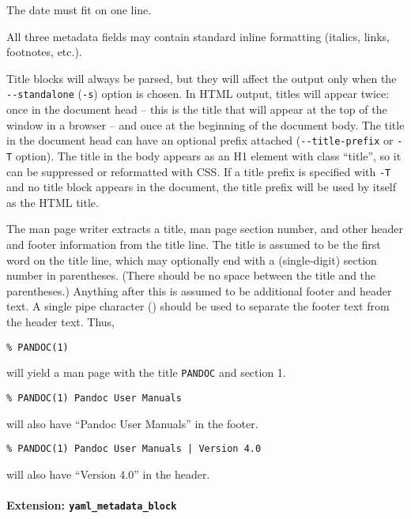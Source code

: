 The date must fit on one line.

All three metadata fields may contain standard inline formatting
(italics, links, footnotes, etc.).

Title blocks will always be parsed, but they will affect the output only
when the \texttt{-\/-standalone} (\texttt{-s}) option is chosen. In HTML
output, titles will appear twice: once in the document head -- this is
the title that will appear at the top of the window in a browser -- and
once at the beginning of the document body. The title in the document
head can have an optional prefix attached (\texttt{-\/-title-prefix} or
\texttt{-T} option). The title in the body appears as an H1 element with
class ``title'', so it can be suppressed or reformatted with CSS. If a
title prefix is specified with \texttt{-T} and no title block appears in
the document, the title prefix will be used by itself as the HTML title.

The man page writer extracts a title, man page section number, and other
header and footer information from the title line. The title is assumed
to be the first word on the title line, which may optionally end with a
(single-digit) section number in parentheses. (There should be no space
between the title and the parentheses.) Anything after this is assumed
to be additional footer and header text. A single pipe character
(\texttt{\textbar{}}) should be used to separate the footer text from
the header text. Thus,

\begin{verbatim}
% PANDOC(1)
\end{verbatim}

will yield a man page with the title \texttt{PANDOC} and section 1.

\begin{verbatim}
% PANDOC(1) Pandoc User Manuals
\end{verbatim}

will also have ``Pandoc User Manuals'' in the footer.

\begin{verbatim}
% PANDOC(1) Pandoc User Manuals | Version 4.0
\end{verbatim}

will also have ``Version 4.0'' in the header.

\hypertarget{extension-yaml_metadata_block}{%
\paragraph{\texorpdfstring{Extension:
\texttt{yaml\_metadata\_block}}{Extension: yaml\_metadata\_block}}\label{extension-yaml_metadata_block}}


